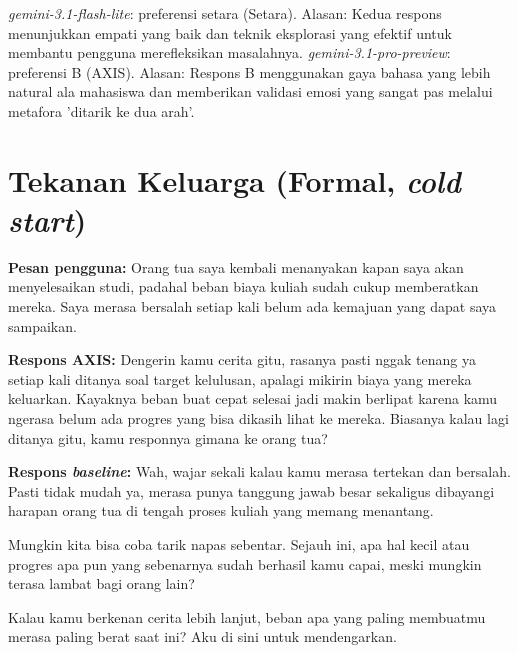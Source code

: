 \textit{gemini-3.1-flash-lite}: preferensi setara (Setara). Alasan: Kedua respons menunjukkan empati yang baik dan teknik eksplorasi yang efektif untuk membantu pengguna merefleksikan masalahnya.\newline
\textit{gemini-3.1-pro-preview}: preferensi B (AXIS). Alasan: Respons B menggunakan gaya bahasa yang lebih natural ala mahasiswa dan memberikan validasi emosi yang sangat pas melalui metafora 'ditarik ke dua arah'.\newline

\section{Tekanan Keluarga (Formal, \textit{cold start})}

\textbf{Pesan pengguna:} Orang tua saya kembali menanyakan kapan saya akan menyelesaikan studi, padahal beban biaya kuliah sudah cukup memberatkan mereka. Saya merasa bersalah setiap kali belum ada kemajuan yang dapat saya sampaikan.

\textbf{Respons AXIS:} Dengerin kamu cerita gitu, rasanya pasti nggak tenang ya setiap kali ditanya soal target kelulusan, apalagi mikirin biaya yang mereka keluarkan. Kayaknya beban buat cepat selesai jadi makin berlipat karena kamu ngerasa belum ada progres yang bisa dikasih lihat ke mereka. Biasanya kalau lagi ditanya gitu, kamu responnya gimana ke orang tua?

\textbf{Respons \textit{baseline}:} Wah, wajar sekali kalau kamu merasa tertekan dan bersalah. Pasti tidak mudah ya, merasa punya tanggung jawab besar sekaligus dibayangi harapan orang tua di tengah proses kuliah yang memang menantang.

Mungkin kita bisa coba tarik napas sebentar. Sejauh ini, apa hal kecil atau progres apa pun yang sebenarnya sudah berhasil kamu capai, meski mungkin terasa lambat bagi orang lain? 

Kalau kamu berkenan cerita lebih lanjut, beban apa yang paling membuatmu merasa paling berat saat ini? Aku di sini untuk mendengarkan.

